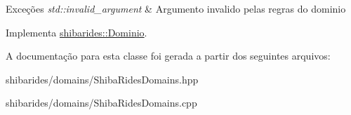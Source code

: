 \begin{DoxyExceptions}{Exceções}
{\em std\+::invalid\+\_\+argument} & Argumento invalido pelas regras do dominio \\
\hline
\end{DoxyExceptions}


Implementa \hyperlink{classshibarides_1_1Dominio_acc9445531455c072bbf708709aebbe55}{shibarides\+::\+Dominio}.



A documentação para esta classe foi gerada a partir dos seguintes arquivos\+:\begin{DoxyCompactItemize}
\item 
shibarides/domains/Shiba\+Rides\+Domains.\+hpp\item 
shibarides/domains/Shiba\+Rides\+Domains.\+cpp\end{DoxyCompactItemize}
